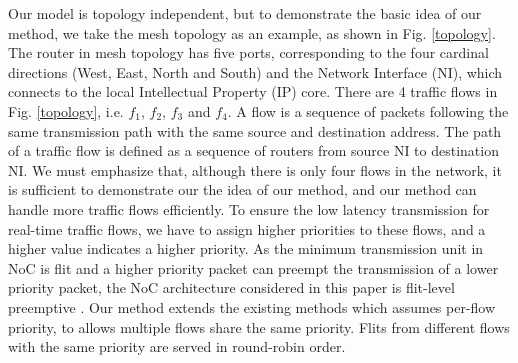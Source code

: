 \documentclass[10pt,journal]{IEEEtran}
\begin{document}
Our model is topology independent, but to demonstrate the basic idea of our method, we take the mesh topology as an example, as shown in Fig. \ref{topology}. The router in mesh topology has five ports, corresponding to the four cardinal directions (West, East, North and South) and the Network Interface (NI), which connects to the local Intellectual Property (IP) core. There are 4 traffic flows in Fig. \ref{topology}, i.e. $f_1$, $f_2$, $f_3$ and $f_4$. A flow is a sequence of packets following the same transmission path with the same source and destination address. The path of a traffic flow is defined as a sequence of routers from source NI to destination NI. We must emphasize that, although there is only four flows in the network, it is sufficient to demonstrate our the idea of our method, and our method can handle more traffic flows efficiently. To ensure the low latency transmission for real-time traffic flows, we have to assign higher priorities to these flows, and a higher value indicates a higher priority. As the minimum transmission unit in NoC is flit and a higher priority packet can preempt the transmission of a lower priority packet, the NoC architecture considered in this paper is flit-level preemptive \cite{Lee:2003:RWC:846077.846083}. Our method extends the existing methods \cite{73}\cite{Qian489900} which assumes per-flow priority, to allows multiple flows share the same priority. Flits from different flows with the same priority are served in round-robin order.
\end{document}
